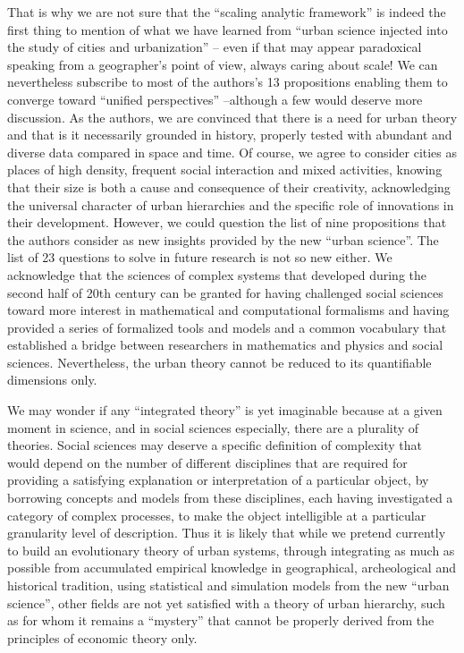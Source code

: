 \documentclass[10pt]{article}
\begin{document}
That is why we are not sure that the ``scaling analytic framework'' is indeed the first thing to mention of what we have learned from ``urban science injected into the study of cities and urbanization'' – even if that may appear paradoxical speaking from a geographer’s point of view, always caring about scale! We can nevertheless subscribe to most of the authors’s 13 propositions enabling them to converge toward ``unified perspectives'' –although a few would deserve more discussion. As the authors, we are convinced that there is a need for urban theory and that is it necessarily grounded in history, properly tested with abundant and diverse data compared in space and time. Of course, we agree to consider cities as places of high density, frequent social interaction and mixed activities, knowing that their size is both a cause and consequence of their creativity, acknowledging the universal character of urban hierarchies and the specific role of innovations in their development. However, we could question the list of nine propositions that the authors consider as new insights provided by the new ``urban science''. The list of 23 questions to solve in future research is not so new either. We acknowledge that the sciences of complex systems that developed during the second half of 20th century can be granted for having challenged social sciences toward more interest in mathematical and computational formalisms and having provided a series of formalized tools and models and a common vocabulary that established a bridge between researchers in mathematics and physics and social sciences. Nevertheless, the urban theory cannot be reduced to its quantifiable dimensions only.

We may wonder if any ``integrated theory'' is yet imaginable because at a given moment in science, and in social sciences especially, there are a plurality of theories. Social sciences may deserve a specific definition of complexity that would depend on the number of different disciplines that are required for providing a satisfying explanation or interpretation of a particular object, by borrowing concepts and models from these disciplines, each having investigated a category of complex processes, to make the object intelligible at a particular granularity level of description. Thus it is likely that while we pretend currently to build an evolutionary theory of urban systems, through integrating as much as possible from accumulated empirical knowledge in geographical, archeological and historical tradition, using statistical and simulation models from the new ``urban science'', other fields are not yet satisfied with a theory of urban hierarchy, such as \cite{krugman1996confronting} for whom it remains a ``mystery'' that cannot be properly derived from the principles of economic theory only.
\end{document}
